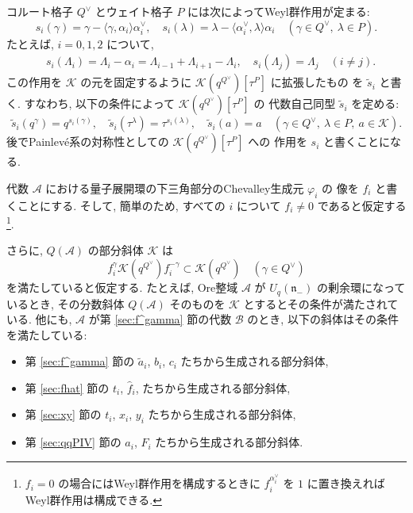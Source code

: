 \documentclass[12pt,twoside,dvipdfm]{msjproc}
\theoremstyle{definition} %
\theoremstyle{definition} %
\theoremstyle{definition} %
\numberwithin{theorem}{section}
\numberwithin{equation}{section}
\numberwithin{figure}{section}
\numberwithin{table}{section}
\newcommand\secref[1]{第 \ref{#1} 節}
\newcommand\nil{\mathfrak{n}}
\newcommand\bra{\langle}
\newcommand\ket{\rangle}
\newcommand\A{\mathcal{A}}
\newcommand\K{\mathcal{K}}
\newcommand\B{\mathcal{B}}
\newcommand\ta{{\tilde{a}}}
\newcommand\ts{{\tilde{s}}}
\newcommand\hf{{\hat{f}}}
\newcommand\av{\alpha^\vee}
\newcommand\Qv{{Q^\vee}}
\begin{document}
コルート格子 $\Qv$ とウェイト格子 $P$ には次によってWeyl群作用が定まる:
\begin{equation*}
 s_i(\gamma) = \gamma - \bra\gamma,\alpha_i\ket\av_i, \quad
 s_i(\lambda)=\lambda - \bra\av_i,\lambda\ket\alpha_i \quad
 (\gamma\in\Qv,\ \lambda\in P).
\end{equation*}
たとえば, $i=0,1,2$ について, 
\begin{align*}
 &
 s_i(\Lambda_i) = \Lambda_i-\alpha_i = \Lambda_{i-1}+\Lambda_{i+1}-\Lambda_i,
 \quad
 s_i(\Lambda_j) = \Lambda_j \quad (i\ne j).
\end{align*}
この作用を $\K$ の元を固定するように $\K(q^\Qv)[\tau^P]$ に拡張したもの
を $\ts_i$ と書く. すなわち, 以下の条件によって $\K(q^\Qv)[\tau^P]$ の
代数自己同型 $\ts_i$ を定める:
\begin{equation*}
 \ts_i(q^\gamma)=q^{s_i(\gamma)}, \quad
 \ts_i(\tau^\lambda)=\tau^{s_i(\lambda)}, \quad
 \ts_i(a) = a \quad
 (\gamma\in\Qv,\ \lambda\in P,\ a\in\K).
\end{equation*}
後でPainlev\'e系の対称性としての $\K(q^\Qv)[\tau^P]$ への
作用を $s_i$ と書くことになる.

代数 $\A$ における量子展開環の下三角部分のChevalley生成元 $\varphi_i$ の
像を $f_i$ と書くことにする.
そして, 簡単のため, すべての $i$ について $f_i\ne 0$ であると仮定する%
\footnote{$f_i=0$ の場合にはWeyl群作用を構成するときに $f_i^{\av_i}$ を
$1$ に置き換えればWeyl群作用は構成できる.}.

さらに, $Q(\A)$ の部分斜体 $\K$ は 
\begin{equation*}
  f_i^\gamma \K(q^\Qv) f_i^{-\gamma} \subset \K(q^\Qv)
  \quad (\gamma\in\Qv)
\end{equation*}
を満たしていると仮定する. 
たとえば, Ore整域 $\A$ が $U_q(\nil_-)$ の剰余環になっているとき, 
その分数斜体 $Q(\A)$ そのものを $\K$ とするとその条件が満たされている.
他にも, $\A$ が\secref{sec:f^gamma}の代数 $\B$ のとき, 
以下の斜体はその条件を満たしている:
\begin{itemize}
\item \secref{sec:f^gamma}の $\ta_i$, $b_i$, $c_i$ たちから生成される部分斜体,
\item \secref{sec:fhat}の $t_i$, $\hf_i$, たちから生成される部分斜体,
\item \secref{sec:xy}の $t_i$, $x_i$, $y_i$ たちから生成される部分斜体,
\item \secref{sec:qqPIV}の $a_i$, $F_i$ たちから生成される部分斜体.
\end{itemize}
\end{document}
